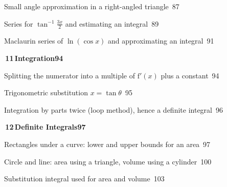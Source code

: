 \documentclass[a4paper,openany]{book}
\begin{document}
{\noindent{}\quad Small angle approximation in a right-angled triangle\dotfill\ 87\par
\noindent{}\quad Series for $\tan ^{-1}\frac {3x}{2}$ and estimating an integral\dotfill\ 89\par
\noindent{}\quad Maclaurin series of $\ln (\cos x)$ and approximating an integral\dotfill\ 91\par
\medskip\noindent\colorbox{blue!8}{\parbox{\dimexpr\textwidth-2\fboxsep}{\large\bfseries\color{blue!50!black}\colorbox{blue!50!black}{\color{white}\,11\,}\quad Integration\hfill 94}}\par\nopagebreak\smallskip\nopagebreak
\noindent{}\quad Splitting the numerator into a multiple of $\mathrm {f}'(x)$ plus a constant\dotfill\ 94\par
\noindent{}\quad Trigonometric substitution $x=\tan \theta $\dotfill\ 95\par
\noindent{}\quad Integration by parts twice (loop method), hence a definite integral\dotfill\ 96\par
\medskip\noindent\colorbox{blue!8}{\parbox{\dimexpr\textwidth-2\fboxsep}{\large\bfseries\color{blue!50!black}\colorbox{blue!50!black}{\color{white}\,12\,}\quad Definite Integrals\hfill 97}}\par\nopagebreak\smallskip\nopagebreak
\noindent{}\quad Rectangles under a curve: lower and upper bounds for an area\dotfill\ 97\par
\noindent{}\quad Circle and line: area using a triangle, volume using a cylinder\dotfill\ 100\par
\noindent{}\quad Substitution integral used for area and volume\dotfill\ 103\par
}
\end{document}
